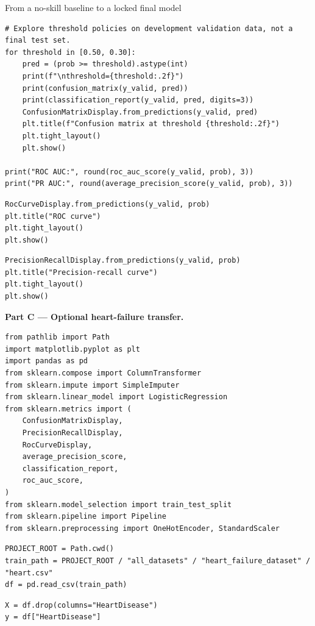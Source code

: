 \begin{labproject}{From a no-skill baseline to a locked final model}
\begin{lstlisting}[style=mlpython]
# Explore threshold policies on development validation data, not a final test set.
for threshold in [0.50, 0.30]:
    pred = (prob >= threshold).astype(int)
    print(f"\nthreshold={threshold:.2f}")
    print(confusion_matrix(y_valid, pred))
    print(classification_report(y_valid, pred, digits=3))
    ConfusionMatrixDisplay.from_predictions(y_valid, pred)
    plt.title(f"Confusion matrix at threshold {threshold:.2f}")
    plt.tight_layout()
    plt.show()

print("ROC AUC:", round(roc_auc_score(y_valid, prob), 3))
print("PR AUC:", round(average_precision_score(y_valid, prob), 3))
\end{lstlisting}

\begin{lstlisting}[style=mlpython]
RocCurveDisplay.from_predictions(y_valid, prob)
plt.title("ROC curve")
plt.tight_layout()
plt.show()
\end{lstlisting}

\begin{lstlisting}[style=mlpython]
PrecisionRecallDisplay.from_predictions(y_valid, prob)
plt.title("Precision-recall curve")
plt.tight_layout()
plt.show()
\end{lstlisting}

\medskip\noindent\textbf{Part C --- Optional heart-failure transfer.}\par
\begin{lstlisting}[style=mlpython]
from pathlib import Path
import matplotlib.pyplot as plt
import pandas as pd
from sklearn.compose import ColumnTransformer
from sklearn.impute import SimpleImputer
from sklearn.linear_model import LogisticRegression
from sklearn.metrics import (
    ConfusionMatrixDisplay,
    PrecisionRecallDisplay,
    RocCurveDisplay,
    average_precision_score,
    classification_report,
    roc_auc_score,
)
from sklearn.model_selection import train_test_split
from sklearn.pipeline import Pipeline
from sklearn.preprocessing import OneHotEncoder, StandardScaler
\end{lstlisting}

\begin{lstlisting}[style=mlpython]
PROJECT_ROOT = Path.cwd()
train_path = PROJECT_ROOT / "all_datasets" / "heart_failure_dataset" / "heart.csv"
df = pd.read_csv(train_path)
\end{lstlisting}

\begin{lstlisting}[style=mlpython]
X = df.drop(columns="HeartDisease")
y = df["HeartDisease"]


\end{lstlisting}
\end{labproject}
